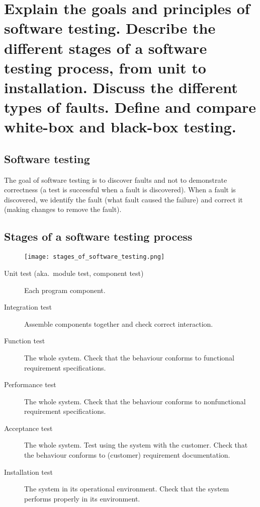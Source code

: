 \clearpage{}
\section{Explain the goals and principles of software testing. Describe the
different stages of a software testing process, from unit to installation.
Discuss the different types of faults. Define and compare white-box and
black-box testing.}


\subsection{Software testing}

The goal of software testing is to discover faults and not to
demonstrate correctness (a test is successful when a fault is
discovered). When a fault is discovered, we identify the fault (what
fault caused the failure) and correct it (making changes to remove the
fault).

\subsection{Stages of a software testing process}

\begin{figure}[!ht]
    \centering
    \texttt{[image: stages\_of\_software\_testing.png]}
\end{figure}

\begin{description}
    \item[Unit test (aka.\ module test, component test)]
    Each program component.
    \item[Integration test]
    Assemble components together and check correct interaction.
    \item[Function test]
    The whole system.
    Check that the behaviour conforms to functional requirement specifications.
    \item[Performance test]
    The whole system.
    Check that the behaviour conforms to nonfunctional requirement specifications.
    \item[Acceptance test]
    The whole system.
    Test using the system with the customer.
    Check that the behaviour conforms to (customer) requirement documentation.
    \item[Installation test]
    The system in its operational environment.
    Check that the system performs properly in its environment.
\end{description}


